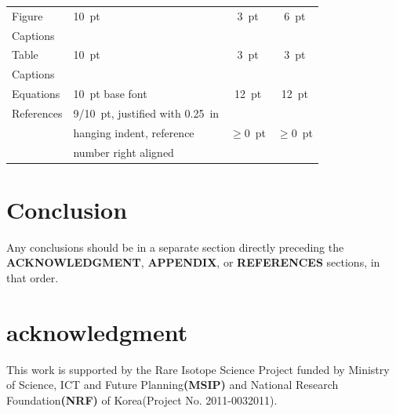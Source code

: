 \documentclass[a4paper,
              ]{jacow}
\newcommand\SEC[1]{\textbf{\uppercase{#1}}}
\begin{document}
\begin{table}[h!t]
\begin{tabular}{@{}llcc@{}}
        \midrule
         Figure        & \SI{10}{pt}                 & \SI{3}{pt}           & \SI{6}{pt}  \\
         Captions      &                             &                 &      \\
        \midrule
         Table         & \SI{10}{pt}                      & \SI{3}{pt}           & \SI{3}{pt}  \\
         Captions      &                             &                 &      \\
        \midrule
         Equations     & \SI{10}{pt} base font            & \SI{12}{pt}          & \SI{12}{pt} \\
        \midrule
         References    & \SI{9/10}{pt}, justified with  \SI{0.25}{in} &      &  \\
                       & hanging indent, reference   & $\ge$\SI{0}{pt} & $\ge$\SI{0}{pt}  \\
                       & number right aligned     &                 &        \\
        \bottomrule
    \end{tabular}
\end{table}

\section{Conclusion}
Any conclusions should be in a separate section directly preceding
the \SEC{Acknowledgment}, \SEC{Appendix}, or \SEC{References} sections, in that
order.

\section{acknowledgment}
This work is supported by the Rare Isotope Science Project funded by Ministry of Science, ICT and Future Planning\SEC{(MSIP)} and National Research Foundation\SEC{(NRF)} of Korea(Project No. 2011-0032011).

%
%
\iftrue   %
	\raggedend
\fi

\iffalse  %
	\printbibliography

\else
\end{document}
